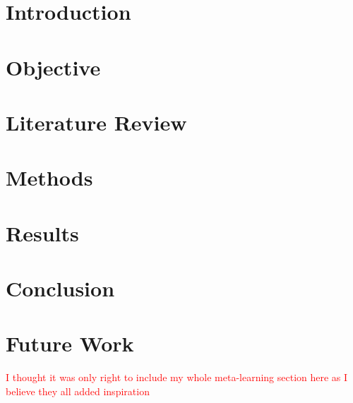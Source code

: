 \documentclass[12pt]{article}
\begin{document}
	\maketitle
	\tableofcontents

	\newpage

	\section{Introduction}

	\section{Objective}

	\section{Literature Review}

	\section{Methods}

	\section{Results}

	\section{Conclusion}
	
	\section{Future Work}


	\nocite{*}

	\newpage %
	\backmatter
	\textcolor{red}{I thought it was only right to include my whole meta-learning section here as I believe they all added inspiration}
	\printbibliography

	\newpage %
	\printindex

	\newpage %
\end{document}
